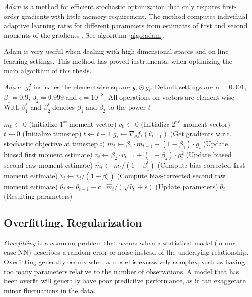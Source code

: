 \textit{Adam} is a method for efficient stochastic optimization that only requires first-order gradients with little memory requirement. The method computes individual adaptive learning rates for different parameters from estimates of first and second moments of the gradients
\cite{cite:adam}. See algorithm \ref{algo:adam}.

Adam is very useful when dealing with high dimensional spaces and on-line learning settings. This method has proved instrumental when optimizing the main algorithm of this thesis.

\newcommand{\wm}{\widehat{m}_t}
\newcommand{\wv}{\widehat{v}_t}
\begin{algorithm}[t]
\caption{\emph{Adam}. $g^2_t$ indicates the elementwise square $g_t \odot g_t$. Default settings are $\alpha=0.001$, $\beta_1=0.9$, $\beta_2=0.999$ and $\epsilon = 10^{-8}$. All operations on vectors are element-wise. With $\beta_1^t$ and $\beta_2^t$ denotes $\beta_1$ and $\beta_2$ to the power $t$.}
\label{algo:adam}
\begin{algorithmic}
\STATE $m_0 \gets 0$ (Initialize $1^\text{st}$ moment vector)
\STATE $v_0 \gets 0$ (Initialize $2^\text{nd}$ moment vector)
\STATE $t \gets 0$ (Initialize timestep)
\STATE $t \gets t + 1$
\STATE $g_t \gets \nabla_{\theta} f_t(\theta_{t-1})$ (Get gradients w.r.t. stochastic objective at timestep $t$)
\STATE $m_t \gets \beta_1 \cdot m_{t-1} + (1-\beta_1) \cdot g_t$ (Update biased first moment estimate)
\STATE $v_t \gets \beta_2 \cdot v_{t-1} + (1-\beta_2) \cdot g^2_t$ (Update biased second raw moment estimate)
\STATE $\wm \gets m_t / (1-\beta_1^t)$ (Compute bias-corrected first moment estimate)
\STATE $\wv \gets v_t / (1-\beta_2^t)$ (Compute bias-corrected second raw moment estimate)
\STATE $\theta_t \gets \theta_{t-1} - \alpha \cdot \wm / (\sqrt{\wv} + \epsilon)$ (Update parameters)
\ENDWHILE
\RETURN $\theta_t$ (Resulting parameters)
\end{algorithmic}
\vspace{-0.05in}
\end{algorithm}

\subsection{Overfitting, Regularization}

\textit{Overfitting} is a common problem that occurs when a  statistical model (in our case NN) describes a random error or noise instead of the underlying relationship. Overfitting generally occurs when a model is excessively complex, such as having too many parameters relative to the number of observations. A model that has been overfit will generally have poor predictive performance, as it can exaggerate minor fluctuations in the data.

